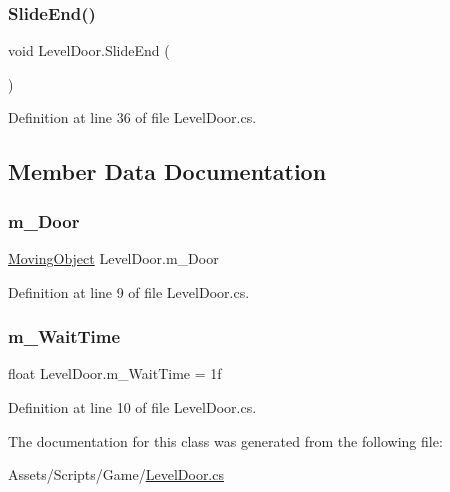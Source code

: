 \subsubsection{\texorpdfstring{Slide\+End()}{SlideEnd()}}
{\footnotesize\ttfamily void Level\+Door.\+Slide\+End (\begin{DoxyParamCaption}{ }\end{DoxyParamCaption})}



Definition at line 36 of file Level\+Door.\+cs.



\subsection{Member Data Documentation}
\mbox{\label{class_level_door_a1792787237881d83a0cc4d69ee829ce3}} 
\subsubsection{\texorpdfstring{m\+\_\+\+Door}{m\_Door}}
{\footnotesize\ttfamily \mbox{\hyperlink{class_moving_object}{Moving\+Object}} Level\+Door.\+m\+\_\+\+Door}



Definition at line 9 of file Level\+Door.\+cs.

\mbox{\label{class_level_door_a60e576366670cb9134d840c012057384}} 
\subsubsection{\texorpdfstring{m\+\_\+\+Wait\+Time}{m\_WaitTime}}
{\footnotesize\ttfamily float Level\+Door.\+m\+\_\+\+Wait\+Time = 1f}



Definition at line 10 of file Level\+Door.\+cs.



The documentation for this class was generated from the following file\+:\begin{DoxyCompactItemize}
\item 
Assets/\+Scripts/\+Game/\mbox{\hyperlink{_level_door_8cs}{Level\+Door.\+cs}}\end{DoxyCompactItemize}
